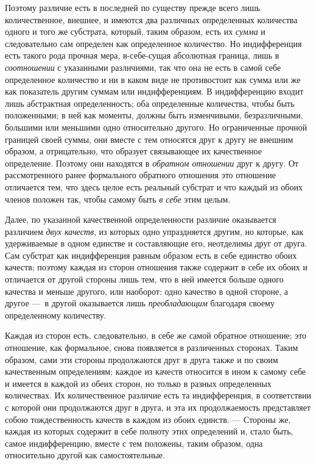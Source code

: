 Поэтому различие есть в последней по существу прежде всего лишь
количественное, внешнее, и имеются два различных определенных количества
одного и того же субстрата, который, таким образом, есть их
{\em сумма} и следовательно сам определен как
определенное количество. Но индифференция есть такого рода прочная мера,
в-себе-сущая абсолютная граница, лишь в
{\em соотношении} с указанными различиями, так что она
не есть в самой себе определенное количество и ни в каком виде не
противостоит как сумма или же как показатель другим суммам или
индифференциям. В индифференцию входит лишь абстрактная определенность; оба
определенные количества, чтобы быть положенными; в ней как моменты, должны
быть изменчивыми, безразличными, большими или меньшими одно относительно
другого. Но ограниченные прочной границей своей суммы, они вместе с тем
относятся друг к другу не внешним образом, а отрицательно, что образует
связывающее их качественное определение. Поэтому они находятся в
{\em обратном отношении} друг к другу. От
рассмотренного ранее формального обратного отношения это отношение
отличается тем, что здесь целое есть реальный субстрат и что каждый из
обоих членов положен так, чтобы самому быть {\em в себе} этим целым.

Далее, по указанной качественной определенности различие оказывается
различием {\em двух качеств}, из которых одно
упраздняется другим, но которые, как удерживаемые в одном единстве и
составляющие его, неотделимы друг от друга. Сам субстрат как индифференция
равным образом есть в себе единство обоих качеств; поэтому каждая из сторон
отношения также содержит в себе их обоих и отличается от другой стороны
лишь тем, что в ней имеется больше одного качества и меньше другого, или
наоборот: одно качество в одной стороне, а другое —~в другой оказывается
лишь {\em преобладающим} благодаря своему определенному
количеству.

Каждая из сторон есть, следовательно, в себе же самой обратное отношение;
это отношение, как формальное, снова появляется в различенных сторонах.
Таким образом, сами эти стороны продолжаются друг в друга также и по своим
качественным определениям; каждое из качеств относится в ином к самому
себе и имеется в каждой из обеих сторон, но только в разных определенных
количествах. Их количественное различие есть та индифференция, в
соответствии с которой они продолжаются друг в друга, и эта их
продолжаемость представляет собою тождественность качеств в каждом из обоих
единств. — Стороны же, каждая из которых содержит в себе полноту этих
определений и, стало быть, самое индифференцию, вместе с тем положены, таким
образом, одна относительно другой как самостоятельные.

